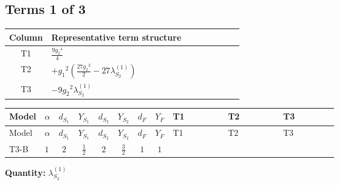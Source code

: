 \documentclass[8pt]{article}
\begin{document}
\begin{landscape}
\subsection*{Terms 1 of 3}
\begin{center}
\begin{tabular}{@{}c >{\raggedright\arraybackslash}p{0.82\linewidth}@{}}
\toprule
Column & Representative term structure \\
\midrule
T1 & \(\displaystyle \frac{9 {g_2}^4}{4}\) \\
\midrule
T2 & \(\displaystyle +{g_1}^2 \left(\frac{27 {g_2}^2}{2}-27 {\lambda_{S_2}^{(1)}}\right)\) \\
\midrule
T3 & \(\displaystyle -9 {g_2}^2 {\lambda_{S_2}^{(1)}}\) \\
\midrule
\bottomrule
\end{tabular}
\end{center}
\smallskip
\tiny
\begin{longtable}{@{}llcccccc >{\raggedright\arraybackslash}p{0.21\linewidth} >{\raggedright\arraybackslash}p{0.21\linewidth} >{\raggedright\arraybackslash}p{0.21\linewidth}@{}}
\toprule
Model & $\alpha$ & $d_{S_1}$ & $Y_{S_1}$ & $d_{S_2}$ & $Y_{S_2}$ & $d_F$ & $Y_F$ & T1 & T2 & T3 \\
\midrule
\endfirsthead
\toprule
Model & $\alpha$ & $d_{S_1}$ & $Y_{S_1}$ & $d_{S_2}$ & $Y_{S_2}$ & $d_F$ & $Y_F$ & T1 & T2 & T3 \\
\midrule
\endhead
T3-B & $1$ & $2$ & $\frac{1}{2}$ & $2$ & $\frac{3}{2}$ & $1$ & $1$ & \scriptsize\adjustbox{max width=\linewidth}{$\begin{gathered} \frac{9 {g_2}^4}{4}\end{gathered}$} & \scriptsize\adjustbox{max width=\linewidth}{$\begin{gathered} +{g_1}^2 \left(\frac{27 {g_2}^2}{2}-27 {\lambda_{S_2}^{(1)}}\right)\end{gathered}$} & \scriptsize\adjustbox{max width=\linewidth}{$\begin{gathered} -9 {g_2}^2 {\lambda_{S_2}^{(1)}}\end{gathered}$} \\
\midrule
\bottomrule
\end{longtable}
\clearpage
\noindent\textbf{Quantity: }$\lambda_{S_2}^{(1)}$\par\smallskip

\end{landscape}
\end{document}
